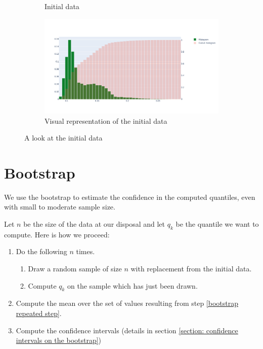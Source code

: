 \documentclass{article}
\begin{document}
\begin{figure}[H]
\begin{subfigure}{.25\textwidth}
        \caption{Initial data}
        \label{fig: initial data}
    \end{subfigure}
    \hfill
    \begin{subfigure}{.74\textwidth}
        \centering
        \includegraphics[width=\textwidth]{images/plot_excel_data.png}
        \caption{Visual representation of the initial data}
        \label{fig: visual representation of the initial data}
    \end{subfigure}
    \caption{A look at the initial data}
\end{figure}

\section{Bootstrap}
\label{section: bootstrap}
We use the bootstrap to estimate the confidence in the computed quantiles, even with small to moderate sample size.

Let \(n\) be the size of the data at our disposal and let \(q_k\) be the quantile we want to compute. Here is how we proceed:
\begin{enumerate}
    \item Do the following \(n\) times.
          \begin{enumerate}
              \item Draw a random sample of size \(n\) with replacement from the initial data.
              \item Compute \(q_k\) on the sample which has just been drawn. \label{bootstrap repeated step}
          \end{enumerate}
    \item Compute the mean over the set of values resulting from step \ref{bootstrap repeated step}.
    \item Compute the confidence intervals (details in section \ref{section: confidence intervals on the bootstrap})
\end{enumerate}
\end{document}
